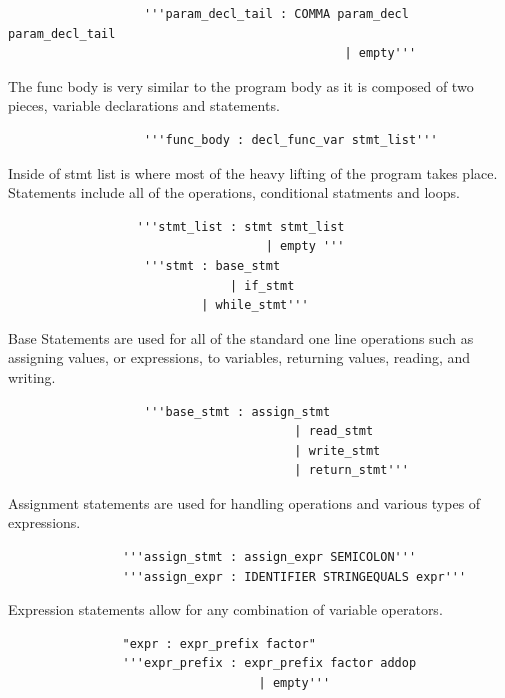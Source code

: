 \documentclass[12pt]{article}
\begin{document}
           \begin{verbatim}
                   '''param_decl_tail : COMMA param_decl param_decl_tail
					                           | empty'''
           \end{verbatim}
           
           The func body is very similar to the program body as it is composed of two pieces, variable declarations and statements.
           
           \begin{verbatim}
                   '''func_body : decl_func_var stmt_list'''
           \end{verbatim}
           
           Inside of stmt list is where most of the heavy lifting of the program takes place.  Statements include all of the operations, conditional statments and loops.
           
            \begin{verbatim}
                  '''stmt_list : stmt stmt_list
				                    | empty '''
				   '''stmt : base_stmt
             				   | if_stmt
		               	   | while_stmt'''
           \end{verbatim}
           
           Base Statements are used for all of the standard one line operations such as assigning values, or expressions, to variables, returning values, reading, and writing.
           \begin{verbatim}
                   '''base_stmt : assign_stmt
					                    | read_stmt
					                    | write_stmt
					                    | return_stmt'''
           \end{verbatim}
           
           Assignment statements are used for handling operations and various types of expressions.
           
           \begin{verbatim}
           		'''assign_stmt : assign_expr SEMICOLON'''
           		'''assign_expr : IDENTIFIER STRINGEQUALS expr'''
            \end{verbatim}		
           
			Expression statements allow for any combination of variable operators.  
			
			\begin{verbatim}
				"expr : expr_prefix factor"      
				'''expr_prefix : expr_prefix factor addop
                                   | empty'''
			\end{verbatim}	   
			
\end{document}
